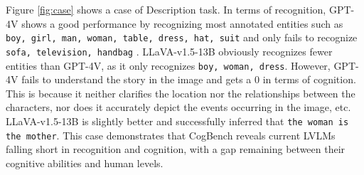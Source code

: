 Figure \ref{fig:case} shows a case of Description task.
In terms of recognition, GPT-4V shows a good performance by recognizing most annotated entities such as \texttt{boy, girl, man, woman, table, dress, hat, suit} and only fails to recognize \texttt{\textcolor{c3}{sofa, television, handbag}} .
LLaVA-v1.5-13B obviously recognizes fewer entities than GPT-4V, as it only recognizes \texttt{boy, woman, dress}.
However, GPT-4V fails to understand the story in the image and gets a 0 in terms of cognition.
This is because it neither clarifies the location nor the relationships between the characters, nor does it accurately depict the events occurring in the image, etc.
LLaVA-v1.5-13B is slightly better and successfully inferred that \texttt{\textcolor{c2}{the woman is the mother}}.
This case demonstrates that CogBench reveals current LVLMs falling short in recognition and cognition, with a gap remaining between their cognitive abilities and human levels.

